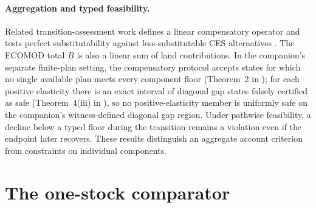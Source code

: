 \documentclass[11pt,a4paper]{article}
\begin{document}
\paragraph{Aggregation and typed feasibility.} Related transition-assessment work defines a linear compensatory operator and tests perfect substitutability against less-substitutable CES alternatives \citep[Sections~2 and 4 of][]{Abaee2026b}. The ECOMOD total $B$ is also a linear sum of land contributions. In the companion's separate finite-plan setting, the compensatory protocol accepts states for which no single available plan meets every component floor (Theorem~2 in \citet{Abaee2026b}); for each positive elasticity there is an exact interval of diagonal gap states falsely certified as safe (Theorem~4(iii) in \citet{Abaee2026b}), so no positive-elasticity member is uniformly safe on the companion's witness-defined diagonal gap region. Under pathwise feasibility, a decline below a typed floor during the transition remains a violation even if the endpoint later recovers. These results distinguish an aggregate account criterion from constraints on individual components.

\section{The one-stock comparator}\label{si:onestock}
\end{document}
